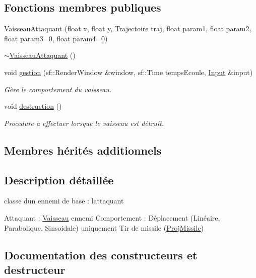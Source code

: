 \subsection*{Fonctions membres publiques}
\begin{DoxyCompactItemize}
\item 
\hyperlink{class_vaisseau_attaquant_a58fd4ab933dd101db82b9287e0c0aafa}{Vaisseau\+Attaquant} (float x, float y, \hyperlink{_trajectoire_8h_afa7f6e8323d7ee755d93cd1f6019dd95}{Trajectoire} traj, float param1, float param2, float param3=0, float param4=0)
\item 
\hyperlink{class_vaisseau_attaquant_a2707dcc90692ba6132ec6aeb659d3620}{$\sim$\+Vaisseau\+Attaquant} ()
\item 
void \hyperlink{class_vaisseau_attaquant_ad95d76e5973affa6ef287edd7ad5310e}{gestion} (sf\+::\+Render\+Window \&window, sf\+::\+Time temps\+Ecoule, \hyperlink{_input_8h_a5588d60d674991c719a8df848313e966}{Input} \&input)
\begin{DoxyCompactList}\small\item\em Gère le comportement du vaisseau. \end{DoxyCompactList}\item 
void \hyperlink{class_vaisseau_attaquant_af804e1fd491301c2385e10d88f4892a6}{destruction} ()
\begin{DoxyCompactList}\small\item\em Procedure a effectuer lorsque le vaisseau est détruit. \end{DoxyCompactList}\end{DoxyCompactItemize}
\subsection*{Membres hérités additionnels}


\subsection{Description détaillée}
classe d\textquotesingle{}un ennemi de base \+: l\textquotesingle{}attaquant 

Attaquant \+: \hyperlink{class_vaisseau}{Vaisseau} ennemi Comportement \+: Déplacement (Linéaire, Parabolique, Sinsoidale) uniquement Tir de missile (\hyperlink{class_proj_missile}{Proj\+Missile}) 

\subsection{Documentation des constructeurs et destructeur}
\mbox{\label{class_vaisseau_attaquant_a58fd4ab933dd101db82b9287e0c0aafa}} 
